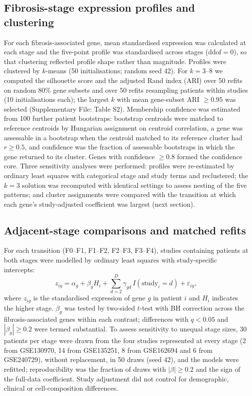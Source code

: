 \documentclass[11pt,a4paper]{article}
\begin{document}
\subsection*{Fibrosis-stage expression profiles and clustering}
For each fibrosis-associated gene, mean standardised expression was calculated at each stage and the five-point profile was standardised across stages ($\mathrm{ddof}=0$), so that clustering reflected profile shape rather than magnitude. Profiles were clustered by $k$-means (50 initialisations; random seed 42). For $k=3$--8 we computed the silhouette score \cite{rousseeuw1987} and the adjusted Rand index (ARI) \cite{hubert1985} over 50 refits on random 80\% gene subsets and over 50 refits resampling patients within studies (10 initialisations each); the largest $k$ with mean gene-subset ARI $\geq0.95$ was selected (Supplementary File: Table S2). Membership confidence was estimated from 100 further patient bootstraps: bootstrap centroids were matched to reference centroids by Hungarian assignment \cite{kuhn1955} on centroid correlation, a gene was assessable in a bootstrap when the centroid matched to its reference cluster had $r\geq0.5$, and confidence was the fraction of assessable bootstraps in which the gene returned to its cluster. Genes with confidence $\geq0.8$ formed the confidence core. Three sensitivity analyses were performed: profiles were re-estimated by ordinary least squares with categorical stage and study terms and reclustered; the $k=3$ solution was recomputed with identical settings to assess nesting of the five patterns; and cluster assignments were compared with the transition at which each gene's study-adjusted coefficient was largest (next section).

\subsection*{Adjacent-stage comparisons and matched refits}
For each transition (F0--F1, F1--F2, F2--F3, F3--F4), studies containing patients at both stages were modelled by ordinary least squares with study-specific intercepts:
\begin{equation}\label{eq:ols}
z_{ig}=\alpha_g+\beta_g H_i+\sum_{d=2}^{D}\gamma_{gd}\,I(\mathrm{study}_i=d)+\varepsilon_{ig},
\end{equation}
where $z_{ig}$ is the standardised expression of gene $g$ in patient $i$ and $H_i$ indicates the higher stage. $\beta_g$ was tested by two-sided $t$-test with BH correction across the fibrosis-associated genes within each contrast; differences with $q<0.05$ and $|\beta_g|\geq0.2$ were termed substantial. To assess sensitivity to unequal stage sizes, 30 patients per stage were drawn from the four studies represented at every stage (2 from GSE130970, 14 from GSE135251, 8 from GSE162694 and 6 from GSE240729), without replacement, in 50 draws (seed 42), and the models were refitted; reproducibility was the fraction of draws with $|\beta|\geq0.2$ and the sign of the full-data coefficient. Study adjustment did not control for demographic, clinical or cell-composition differences.
\end{document}
